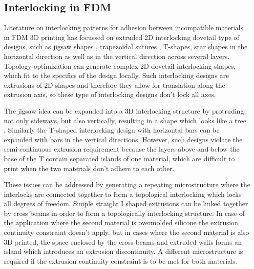 \subsection{Interlocking in FDM}

Literature on interlocking patterns for adhesion between incompatible materials in FDM 3D printing has focussed on extruded 2D interlocking dovetail type of designs,
such as jigsaw shapes \cite{malik2017}, trapezoidal sutures \cite{Li2013}, T-shapes\cite{Ribeiro2019,mustafa2021development}, star shapes \cite{Wang2021} in the horizontal direction
as well as in the vertical direction across several layers\cite{debora2020}.
Topology optimization can generate complex 2D dovetail interlocking shapes, which fit to the specifics of the design locally\cite{aharoni2021}.
Such interlocking designs are extrusions of 2D shapes and therefore they allow for translation along the extrusion axis, so these type of interlocking designs don't lock all axes.

The jigsaw idea can be expanded into a 3D interlocking structure by protruding not only sideways, but also vertically, resulting in a shape which looks like a tree \cite{gouker2006manufacturing}.
Similarly the T-shaped interlocking design with horizontal bars can be expanded with bars in the vertical directions.
However, such designs violate the semi-continuous extrusion requirement because the layers above and below the base of the T contain separated islands of one material, 
which are difficult to print when the two materials don't adhere to each other.

These issues can be addressed by generating a repeating microstructure where the interlocks are connected together to form a topological interlocking which locks all degrees of freedom.
Simple straight I shaped extrusions can be linked together by cross beams in order to form a topologically interlocking structure\cite{Rossing2020}.
In case of the application where the second material is overmolded silicone the extrusion continuity constraint doesn't apply,
but in cases where the second material is also 3D printed, the space enclosed by the cross beams and extruded walls forms an island which introduces an extrusion discontinuity.
A different microstructure is required if the extrusion continuity constraint is to be met for both materials.



